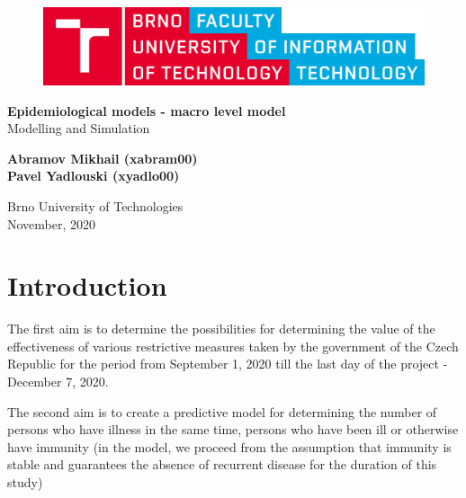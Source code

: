 \documentclass[12pt,a4paper,english]{article}
\newcommand{\todo}[1]{\textcolor{red}{[[\textbf{TODO} \textbf{#1]]}}}
\begin{document}
    \begin{titlepage}
        \begin{center}
            \vspace*{1cm}
        
            \begin{figure}[h!]
                \includegraphics[scale=0.12]{VUT-FIT-logo-en.png}
            \end{figure}
            \vspace{1.5cm}

            \Large{\textbf{Epidemiological models - macro level model}} \\
            \large{Modelling and Simulation}

            \vspace{0.5cm}
                
            \vspace{1.5cm}
            
            \textbf{Abramov Mikhail (xabram00)} \\
            \textbf{Pavel Yadlouski (xyadlo00)} 

            \vfill
                
            \vspace{0.8cm}
        
            Brno University of Technologies\\
            November, 2020
                
        \end{center}
    \end{titlepage}

    \tableofcontents
    \newpage

    \section{Introduction}
    The first aim is to determine the possibilities for determining the value of the effectiveness of various restrictive measures taken by the government of the Czech Republic for the period from September 1, 2020 till the last day of the project - December 7, 2020.

    The second aim is to create a predictive model for determining the number of persons who have illness in the same time, persons who have been ill or otherwise have immunity
    (in the model, we proceed from the assumption that immunity is stable and guarantees the absence of recurrent disease for the duration of this study)
    
\end{document}
